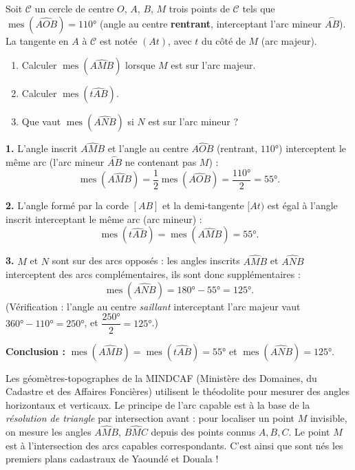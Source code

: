 \documentclass[11pt]{article}
\newcommand{\cle}[1]{{\popxbold\color{popdark}#1}}
\begin{document}
\begin{exoresolu}
Soit $\mathcal{C}$ un cercle de centre $O$, $A$, $B$, $M$ trois points de $\mathcal{C}$ tels que $\operatorname{mes}(\widehat{AOB})=110°$ (angle au centre \textbf{rentrant}, interceptant l'arc mineur $\overset{\frown}{AB}$). La tangente en $A$ à $\mathcal{C}$ est notée $(At)$, avec $t$ du côté de $M$ (arc majeur).
\begin{enumerate}
\item Calculer $\operatorname{mes}(\widehat{AMB})$ lorsque $M$ est sur l'arc majeur.
\item Calculer $\operatorname{mes}(\widehat{tAB})$.
\item Que vaut $\operatorname{mes}(\widehat{ANB})$ si $N$ est sur l'arc mineur ?
\end{enumerate}
\tcblower
\textbf{1.} L'angle inscrit $\widehat{AMB}$ et l'angle au centre $\widehat{AOB}$ (rentrant, $110°$) interceptent le même arc (l'arc mineur $\overset{\frown}{AB}$ ne contenant pas $M$) :
\[
\operatorname{mes}(\widehat{AMB})=\frac12\operatorname{mes}(\widehat{AOB})=\frac{110°}{2}=55°.
\]

\textbf{2.} L'angle formé par la corde $[AB]$ et la demi-tangente $[At)$ est égal à l'angle inscrit interceptant le même arc (arc mineur) :
\[
\operatorname{mes}(\widehat{tAB})=\operatorname{mes}(\widehat{AMB})=55°.
\]

\textbf{3.} $M$ et $N$ sont sur des arcs opposés : les angles inscrits $\widehat{AMB}$ et $\widehat{ANB}$ interceptent des arcs complémentaires, ils sont donc supplémentaires :
\[
\operatorname{mes}(\widehat{ANB})=180°-55°=125°.
\]
(Vérification : l'angle au centre \emph{saillant} interceptant l'arc majeur vaut $360°-110°=250°$, et $\dfrac{250°}{2}=125°$.)

\textbf{Conclusion :} $\operatorname{mes}(\widehat{AMB})=\operatorname{mes}(\widehat{tAB})=55°$ et $\operatorname{mes}(\widehat{ANB})=125°$.
\end{exoresolu}

\begin{savaistu}
Les géomètres-topographes de la MINDCAF (Ministère des Domaines, du Cadastre et des Affaires Foncières) utilisent le \cle{théodolite} pour mesurer des angles horizontaux et verticaux. Le principe de l'arc capable est à la base de la \emph{résolution de triangle} par intersection avant : pour localiser un point $M$ invisible, on mesure les angles $\widehat{AMB}$, $\widehat{BMC}$ depuis des points connus $A,B,C$. Le point $M$ est à l'intersection des arcs capables correspondants. C'est ainsi que sont nés les premiers plans cadastraux de Yaoundé et Douala !
\end{savaistu}
\end{document}
